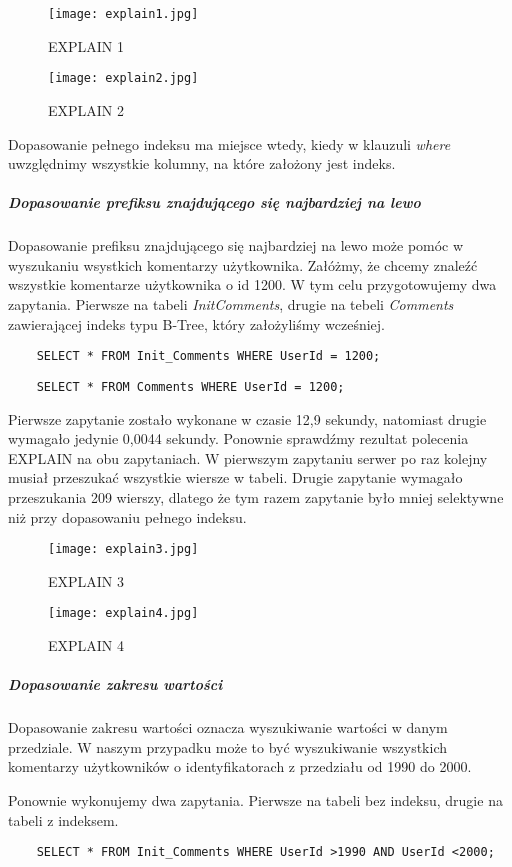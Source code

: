 \begin{figure}[h]
    \texttt{[image: explain1.jpg]} 
    \caption{EXPLAIN 1}
\end{figure}

\begin{figure}[h]
    \texttt{[image: explain2.jpg]} 
    \caption{EXPLAIN 2}
\end{figure}

Dopasowanie pełnego indeksu ma miejsce wtedy, kiedy w klauzuli \textit{where} uwzględnimy wszystkie kolumny, na które założony jest indeks. 
\subparagraph{Dopasowanie prefiksu znajdującego się najbardziej na lewo}\mbox{} 
Dopasowanie prefiksu znajdującego się najbardziej na lewo może pomóc w wyszukaniu wsystkich komentarzy użytkownika. Załóżmy, że chcemy znaleźć wszystkie komentarze użytkownika o id 1200.
W tym celu przygotowujemy dwa zapytania. Pierwsze na tabeli \textit{Init\textunderscore Comments}, drugie na tebeli \textit{Comments} zawierającej indeks typu B-Tree, który założyliśmy wcześniej.
\begin{verbatim}
    SELECT * FROM Init_Comments WHERE UserId = 1200;
\end{verbatim}
\begin{verbatim}
    SELECT * FROM Comments WHERE UserId = 1200;
\end{verbatim}
Pierwsze zapytanie zostało wykonane w czasie 12,9 sekundy, natomiast drugie wymagało jedynie 0,0044 sekundy. Ponownie sprawdźmy rezultat polecenia EXPLAIN na obu zapytaniach. W pierwszym zapytaniu serwer po raz kolejny musiał przeszukać wszystkie wiersze w tabeli. Drugie zapytanie wymagało przeszukania 209 wierszy, dlatego że tym razem zapytanie było mniej selektywne niż przy dopasowaniu pełnego indeksu.
\begin{figure}[h]
    \texttt{[image: explain3.jpg]} 
    \caption{EXPLAIN 3}
\end{figure}

\begin{figure}[h]
    \texttt{[image: explain4.jpg]} 
    \caption{EXPLAIN 4}
\end{figure}

\subparagraph{Dopasowanie zakresu wartości}\mbox{}
Dopasowanie zakresu wartości oznacza wyszukiwanie wartości w danym przedziale. W naszym przypadku może to być wyszukiwanie wszystkich komentarzy użytkowników o identyfikatorach z przedziału od 1990 do 2000.

Ponownie wykonujemy dwa zapytania. Pierwsze na tabeli bez indeksu, drugie na tabeli z indeksem.
\begin{verbatim}
    SELECT * FROM Init_Comments WHERE UserId >1990 AND UserId <2000;
\end{verbatim}

